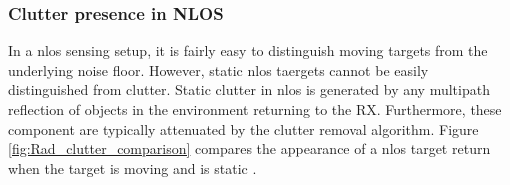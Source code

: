 	
	\subsubsection{Clutter presence in NLOS}
	
	In a \gls{nlos} sensing setup, it is fairly easy to distinguish moving targets from the underlying noise floor.
	However, static \gls{nlos} taergets cannot be easily distinguished from clutter. Static clutter in \gls{nlos} is generated by any multipath reflection of objects in the environment returning to the RX. Furthermore, these component are typically attenuated by the clutter removal algorithm.
	Figure \ref{fig:Rad_clutter_comparison} compares the appearance of a \gls{nlos} target return when the target is moving  and is static .

